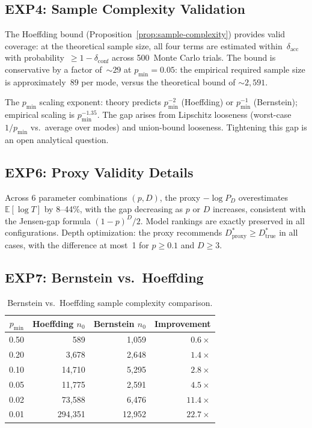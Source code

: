 \documentclass[twoside,11pt]{article}
\newcommand{\E}{\mathbb{E}}
\newcommand{\pmin}{p_{\min}}
\newcommand{\dacc}{\delta_{\mathrm{acc}}}
\newcommand{\dconf}{\delta_{\mathrm{conf}}}
\newcommand{\Dstar}{D^*}
\begin{document}
\subsection{EXP4: Sample Complexity Validation}

The Hoeffding bound (Proposition~\ref{prop:sample-complexity}) provides valid coverage: at the theoretical sample size, all four terms are estimated within~$\dacc$ with probability~$\ge 1 - \dconf$ across 500~Monte Carlo trials.
The bound is conservative by a factor of~$\sim 29$ at $\pmin = 0.05$: the empirical required sample size is approximately~$89$ per mode, versus the theoretical bound of $\sim 2{,}591$.

The $\pmin$ scaling exponent: theory predicts $\pmin^{-2}$ (Hoeffding) or $\pmin^{-1}$ (Bernstein); empirical scaling is $\pmin^{-1.35}$.
The gap arises from Lipschitz looseness (worst-case $1/\pmin$ vs.\ average over modes) and union-bound looseness.
Tightening this gap is an open analytical question.

\subsection{EXP6: Proxy Validity Details}

Across 6 parameter combinations $(p, D)$, the proxy $-\log P_D$ overestimates $\E[\log T]$ by 8--44\%, with the gap decreasing as $p$ or $D$ increases, consistent with the Jensen-gap formula $(1-p)^D/2$.
Model rankings are exactly preserved in all configurations.
Depth optimization: the proxy recommends $\Dstar_{\mathrm{proxy}} \ge \Dstar_{\mathrm{true}}$ in all cases, with the difference at most~1 for $p \ge 0.1$ and $D \ge 3$.

\subsection{EXP7: Bernstein vs.\ Hoeffding}

\begin{table}[ht]
\centering
\caption{Bernstein vs.\ Hoeffding sample complexity comparison.}
\label{tab:bernstein}
\begin{tabular}{rrrr}
\toprule
$\pmin$ & Hoeffding $n_0$ & Bernstein $n_0$ & Improvement \\
\midrule
0.50 & 589 & 1{,}059 & $0.6\times$ \\
0.20 & 3{,}678 & 2{,}648 & $1.4\times$ \\
0.10 & 14{,}710 & 5{,}295 & $2.8\times$ \\
0.05 & 11{,}775 & 2{,}591 & $4.5\times$ \\
0.02 & 73{,}588 & 6{,}476 & $11.4\times$ \\
0.01 & 294{,}351 & 12{,}952 & $22.7\times$ \\
\bottomrule
\end{tabular}
\end{table}
\end{document}
